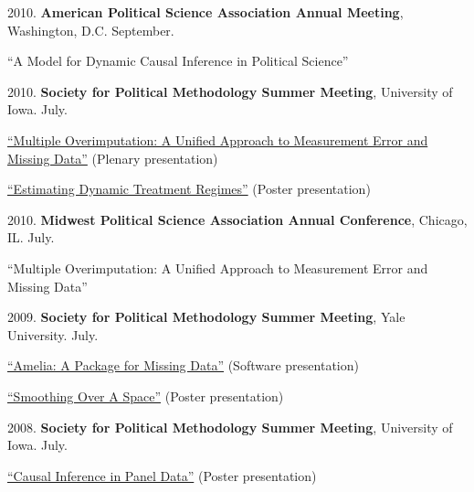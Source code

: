 \documentclass[margin,line]{res}
\newenvironment{list1}{
  \begin{list}{\ding{113}}{%
      \setlength{\itemsep}{0in}
      \setlength{\parsep}{0in} \setlength{\parskip}{0in}
      \setlength{\topsep}{0in} \setlength{\partopsep}{0in} 
      \setlength{\leftmargin}{0.83 cm}}}{\end{list}}
\begin{document}
\begin{resume}
2010. {\bf American Political Science Association Annual Meeting}, Washington, D.C. September. 
\begin{list1} 
\item[] “A Model for Dynamic Causal Inference in Political
    Science”
\end{list1}\vspace{-0em}
2010. {\bf Society for Political Methodology  Summer Meeting}, University of Iowa. July.
\begin{list1}
\item[] \href{http://mattblackwell.org/files/papers/merror-methods.pdf}{“Multiple Overimputation: A Unified Approach to Measurement Error and
Missing Data”} (Plenary presentation)
\item[] \href{http://mattblackwell.org/files/papers/panel-poster.pdf}{“Estimating Dynamic Treatment Regimes”} (Poster presentation)
\end{list1}\vspace{-0em}

2010. {\bf Midwest Political Science Association Annual Conference}, Chicago, IL. July. 
\begin{list1}
\item[] “Multiple Overimputation: A Unified Approach to Measurement Error and
Missing Data”
\end{list1}\vspace{-0em}

2009. {\bf Society for Political Methodology  Summer Meeting}, Yale University. July.
\begin{list1}
\item[]  \href{http://mattblackwell.org/files/papers/amelia-polmeth.pdf}{“Amelia: A Package for Missing Data”} (Software presentation)
\item[]  \href{http://mattblackwell.org/files/papers/polls-poster.pdf}{“Smoothing Over A Space”} (Poster presentation)
\end{list1}\vspace{-0em}

2008. {\bf Society for Political Methodology  Summer Meeting}, University of Iowa. July.
\begin{list1}
\item[] \href{http://mattblackwell.org/files/papers/tsposter.pdf}{“Causal Inference in Panel Data”} (Poster presentation)
\end{list1}\vspace{-.5em}


\end{resume}
\end{document}
